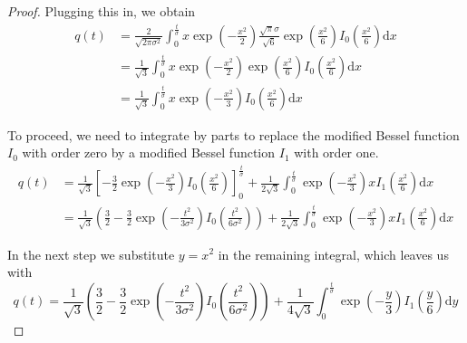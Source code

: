 \documentclass[a4paper,12pt]{article}
\theoremstyle{plain}
\theoremstyle{definition}
\begin{document}
\begin{proof}
	Plugging this in, we obtain
	\begin{align*}
		q(t) &= \frac{2}{\sqrt{2 \pi \sigma^2}} \int_0^\frac{t}{\sigma} x \exp \left( - \frac{x^2}{2} \right) \frac{\sqrt{\pi} \sigma}{\sqrt{6}} \exp \left( \frac{x^2}{6} \right) I_0 \left( \frac{x^2}{6} \right) \mathrm{d}x \\
		&= \frac{1}{\sqrt{3}} \int_0^\frac{t}{\sigma} x \exp \left( - \frac{x^2}{2} \right) \exp \left( \frac{x^2}{6} \right) I_0 \left( \frac{x^2}{6} \right) \mathrm{d}x \\
		&= \frac{1}{\sqrt{3}} \int_0^\frac{t}{\sigma} x \exp \left( - \frac{x^2}{3} \right) I_0 \left( \frac{x^2}{6} \right) \mathrm{d}x
	\end{align*}
	
	To proceed, we need to integrate by parts to replace the modified Bessel function $I_0$ with order zero by a modified Bessel function $I_1$ with order one.
	\begin{align*}
		q(t) &= \frac{1}{\sqrt{3}} \left[ - \frac{3}{2} \exp \left( - \frac{x^2}{3} \right) I_0 \left( \frac{x^2}{6} \right) \right]_0^\frac{t}{\sigma} + \frac{1}{2 \sqrt{3}} \int_0^\frac{t}{\sigma} \exp \left( - \frac{x^2}{3} \right) x I_1 \left( \frac{x^2}{6} \right) \mathrm{d}x \\
		&= \frac{1}{\sqrt{3}} \left( \frac{3}{2} - \frac{3}{2} \exp \left( - \frac{t^2}{3 \sigma^2} \right) I_0 \left( \frac{t^2}{6 \sigma^2} \right) \right) + \frac{1}{2 \sqrt{3}} \int_0^\frac{t}{\sigma} \exp \left( - \frac{x^2}{3} \right) x I_1 \left( \frac{x^2}{6} \right) \mathrm{d}x
	\end{align*}
	
	In the next step we substitute $y = x^2$ in the remaining integral, which leaves us with
	\begin{equation*}
		q(t) = \frac{1}{\sqrt{3}} \left( \frac{3}{2} - \frac{3}{2} \exp \left( - \frac{t^2}{3 \sigma^2} \right) I_0 \left( \frac{t^2}{6 \sigma^2} \right) \right) + \frac{1}{4 \sqrt{3}} \int_0^\frac{t}{\sigma} \exp \left( - \frac{y}{3} \right) I_1 \left( \frac{y}{6} \right) \mathrm{d}y
	\end{equation*}
	

\end{proof}
\end{document}
